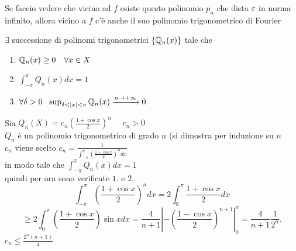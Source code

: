 \documentclass[12px]{article}
\begin{document}
	 Se faccio vedere che vicino ad $f$ esiste questo polinomio $p_n$ che dista  $\varepsilon$ in norma infinito, allora vicino a  $f$ c'è anche il suo polinomio trigonometrico di Fourier
	 \begin{lemm}
		 $\exists$ successione di polinomi trigonometrici  $\{\mathbb{Q}_n(x)\}$ tale che  
		 \begin{enumerate}
			 \item $\mathbb{Q}_n(x)\geq 0 \ \ \ \forall x\in X$
			 \item  $\int_{-\pi}^\pi Q_n(x)dx = 1$
			 \item  $\forall \delta > 0 \ \ \sup_{\delta < |x| < \pi} \mathbb{Q}_n(x) \xrightarrow{ n \rightarrow +\infty} 0$
		 \end{enumerate}
	 \end{lemm}
	 \begin{dimo}
		 Sia $Q_n(X) = c_n \left( \frac { 1 + \cos x}{2} \right)^n$ \ \ $c_n > 0$\\
		  $Q_n$ è un polinomio trigonometrico di grado  $n$ (si dimostra per induzione su $n$\\
	  $c_n$ viene scelto  $\displaystyle c_n = \frac { 1}{\int_{-\pi}^\pi \left(\frac{1 + \cos x}{2} \right)^ndx}$\\
	  in modo tale che $\int_{-\pi}^\pi Q_n(x) dx = 1$\\
	  quindi per ora sono verificate $1. $ e  $2.$ \\
	   \[
		   \int_{-\pi}^\pi \left(\frac {1 + \cos x}{2} \right)^ndx = 2 \int_0^\pi \frac {1 + \cos x}{2}dx
	  \] 
	  \[
		  \geq 2 \int_0^\pi \left(\frac {1 + \cos x}{2} \right)\sin xdx = \frac{4}{n+1} \left| - \left(\frac { 1 - \cos x}{2} \right)^{n+1} \right|^\pi_0 = \frac{4}{n+1}\frac{1}{2^n}
	  .\] 
	  $\displaystyle c_n \leq \frac{2^n(n+1)}4$
	 \end{dimo}
\end{document}
